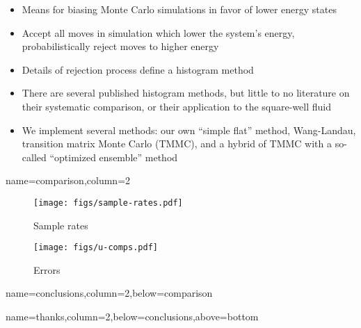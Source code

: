 \documentclass[paperwidth=48in,paperheight=36in,
fontscale=0.27,margin=0.75in]{baposter}
\begin{document}
\begin{poster}
{    %



    \begin{itemize}
    \item Means for biasing Monte Carlo simulations in favor of lower
      energy states
    \item Accept all moves in simulation which lower the system's
      energy, probabilistically reject moves to higher energy
    \item Details of rejection process define a histogram method
    \item There are several published histogram methods, but little to
      no literature on their systematic comparison, or their
      application to the square-well fluid
    \item We implement several methods: our own ``simple flat''
      method, Wang-Landau, transition matrix Monte Carlo (TMMC), and a
      hybrid of TMMC with a so-called ``optimized ensemble'' method
    \end{itemize}

  }

  {name=comparison,column=2}{%

    \begin{figure}[H]
      \centering
      \texttt{[image: figs/sample-rates.pdf]}
      \caption{Sample rates}
      \label{fig:sample_rates}
    \end{figure}
    \begin{figure}[H]
      \centering
      \texttt{[image: figs/u-comps.pdf]}
      \caption{Errors}
      \label{fig:errors}
    \end{figure}

  }

  {name=conclusions,column=2,below=comparison}{%



  }

  {name=thanks,column=2,below=conclusions,above=bottom}{%



  }

\end{poster}
\end{document}
